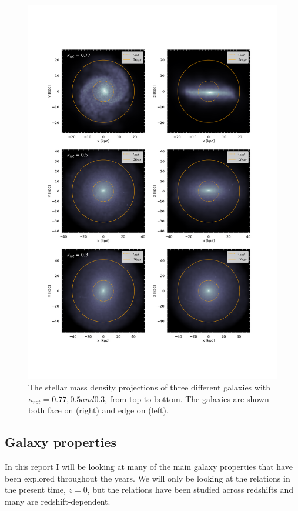 \begin{figure}
    \centering
    \includegraphics[width=\textwidth]{images/kappa_rot.png}
    \caption{The stellar mass density projections of three different galaxies with $\kappa_{rot} = 0.77, 0.5 and 0.3$, from top to bottom. The galaxies are shown both face on (right) and edge on (left).}
    \label{kappa_rot}
\end{figure}

\subsection{Galaxy properties}
In this report I will be looking at many of the main galaxy properties that have been explored throughout the years. We will only be looking at the relations in the present time, $z=0$, but the relations have been studied across redshifts and many are redshift-dependent.

